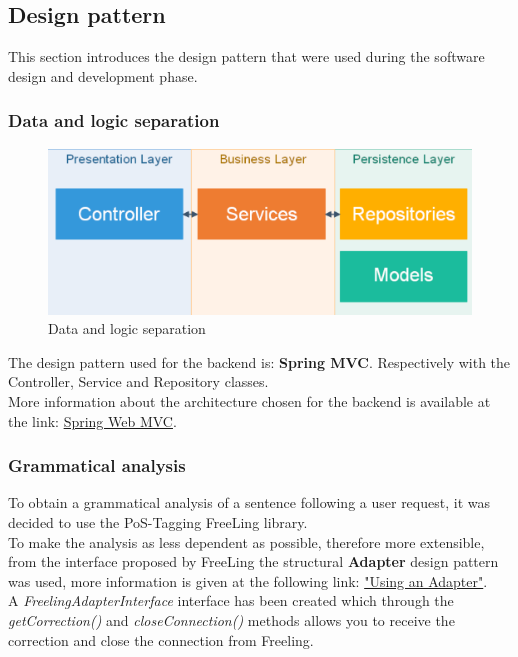 \subsection{Design pattern}
\label{sec:BackendDesignPattern}
This section introduces the design pattern that were used during the software design and development phase. 
\subsubsection{Data and logic separation}
\begin{figure}[H]
\centering 
\includegraphics[scale=0.3]{uml/backendArchitecture.png} 
\caption{Data and logic separation}
\end{figure}

The design pattern used for the backend is: \textbf{Spring MVC}.
Respectively with the Controller, Service and Repository classes.
\\ 
More information about the architecture chosen for the backend is available at the link: \href{https://docs.spring.io/spring/docs/current/spring-framework-reference/web.html}{Spring Web MVC}.

\subsubsection{Grammatical analysis}
To obtain a grammatical analysis of a sentence following a user request, it was decided to use the PoS-Tagging FreeLing library.\\
To make the analysis as less dependent as possible, therefore more extensible, from the interface proposed by FreeLing the structural \textbf{Adapter} design pattern was used, more information is given at the following link: \href{https://www.martinfowler.com/bliki/RequiredInterface.html}{"Using an Adapter"}.\\
A \textit{FreelingAdapterInterface} interface has been created which through the \textit{getCorrection()} and \textit{closeConnection()} methods allows you to receive the correction and close the connection from Freeling. 

